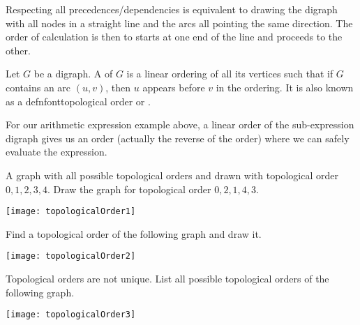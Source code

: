 Respecting all precedences/dependencies is equivalent to drawing the digraph with all nodes in a straight line and the arcs all pointing the same direction. The order of calculation is then to starts at one end of the line and proceeds to the other.




\begin{Definition}
Let $G$ be a digraph. A  of $G$ is a linear
ordering of all its vertices such that if $G$ contains an arc $(u,v)$,
then $u$ appears before $v$ in the ordering. It is also known as  a defnfont{topological order} or .
\end{Definition}

For our arithmetic expression example above, a linear
order of the sub-expression digraph gives us an order (actually the reverse
of the order) where we can safely evaluate the expression.




\begin{Boxample}[1]
A graph with all possible topological orders and drawn with topological order $0, 1, 2, 3, 4$.  Draw the graph for topological order $0, 2, 1, 4, 3$. 
\begin{center}
\texttt{[image: topologicalOrder1]}
\end{center}
Find a topological order of the following graph and draw it.
\begin{center}
\texttt{[image: topologicalOrder2]}
\end{center}
Topological orders are not unique. List all possible topological orders of the following graph.
\begin{center}
\texttt{[image: topologicalOrder3]}
\end{center}
\end{Boxample}

